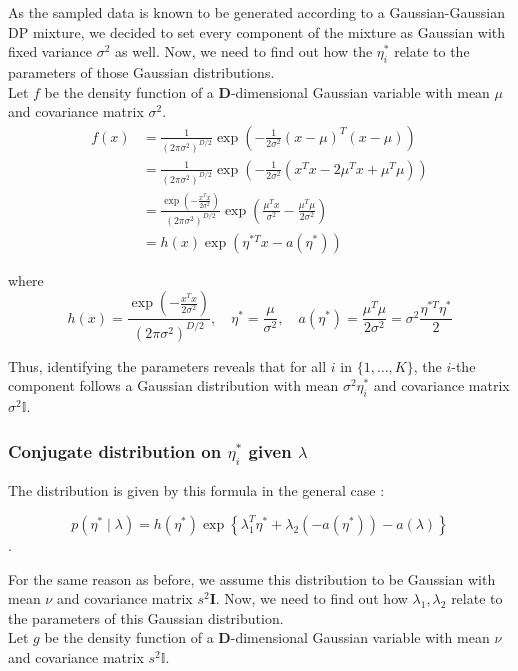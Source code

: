 \documentclass{article}
\begin{document}
As the sampled data is known to be generated according to a Gaussian-Gaussian DP mixture, we decided to set every component of the mixture as Gaussian with fixed variance $\sigma^2$ as well. Now, we need to find out how the $\eta_i^*$ relate to the parameters of those Gaussian distributions.\\

Let $f$ be the density function of a $\mathbf{D}$-dimensional Gaussian variable with mean $\mu$ and covariance matrix $\sigma^2$.
\begin{align*}
f(x) &= \frac{1}{(2\pi \sigma^2)^{D/2}}\exp\left(-\frac{1}{2\sigma^2}(x-\mu)^T(x-\mu)\right) \\
&= \frac{1}{(2\pi \sigma^2)^{D/2}}\exp\left(-\frac{1}{2\sigma^2}(x^Tx - 2\mu^Tx+\mu^T\mu)\right) \\
&= \frac{\exp\left(-\frac{x^Tx}{2\sigma^2}\right)}{(2\pi \sigma^2)^{D/2}}\exp\left(\frac{\mu^Tx}{\sigma^2}-\frac{\mu^T\mu}{2\sigma^2}\right)\\
&= h(x)\exp\left(\eta^{*T}x-a(\eta^*)\right)
\end{align*}

where $$h(x) = \frac{\exp\left(-\frac{x^Tx}{2\sigma^2}\right)}{(2\pi \sigma^2)^{D/2}},\quad \eta^* = \frac{\mu}{\sigma^2},\quad a(\eta^*) = \frac{\mu^T\mu}{2\sigma^2} = \sigma^2 \frac{ \eta^{*T} \eta^*}{2}$$


Thus, identifying the parameters reveals that for all \(i\) in \(\{1, \ldots, K\}\), the \(i\)-the component follows a Gaussian distribution with mean \(\sigma^2\eta^*_i\) and covariance matrix \(\sigma^2\mathbb{I}\).

\subsubsection{Conjugate distribution on $\eta_i^*$ given $\lambda$}
The distribution is given by this formula in the general case :

$$p\left(\eta^* \mid \lambda\right)=h\left(\eta^*\right) \exp \left\{\lambda_1^T \eta^*+\lambda_2\left(-a\left(\eta^*\right)\right)-a(\lambda)\right\}$$.

For the same reason as before, we assume this distribution to be Gaussian with mean $\nu$ and covariance matrix $s^2\mathbf{I}$.
Now, we need to find out how $\lambda_1, \lambda_2$ relate to the parameters of this Gaussian distribution.\\

Let $g$ be the density function of a $\mathbf{D}$-dimensional Gaussian variable with mean $\nu$ and covariance matrix $s^2\mathbb{I}$.
\end{document}
